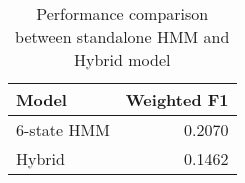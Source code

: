\begin{table}
\caption{Performance comparison between standalone HMM and Hybrid model}
\label{tab:hmm_vs_hybrid}
\begin{tabular}{lr}
\toprule
Model & Weighted F1 \\
\midrule
6-state HMM & 0.2070 \\
Hybrid & 0.1462 \\
\bottomrule
\end{tabular}
\end{table}
